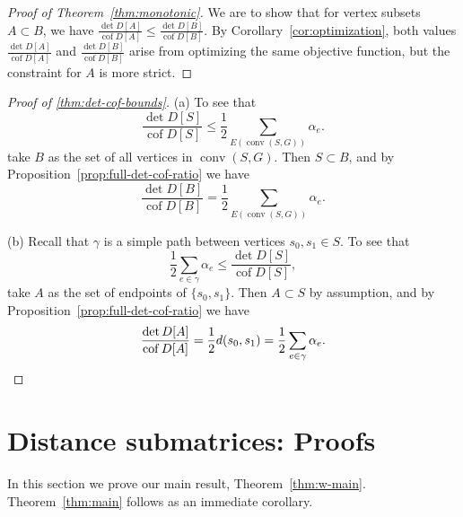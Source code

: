 \documentclass{amsart}
\theoremstyle{definition}
\DeclareMathOperator{\cof}{cof}
\DeclareMathOperator{\conv}{conv}
\newcommand{\display}{\displaystyle}
\begin{document}
\begin{proof}[Proof of Theorem~\ref{thm:monotonic}]
We are to show that for vertex subsets $A \subset B$, we have
$\displaystyle 
\frac{\det D[A]}{\cof D[A]} \leq \frac{\det D[B]}{\cof D[B]}.
$
By Corollary~\ref{cor:optimization}, both values $\display \frac{\det D[A]}{\cof D[A]}$ and $\display \frac{\det D[B]}{\cof D[B]}$ arise from optimizing the same objective function, 
but the constraint for $A$ is more strict.
\end{proof}

\begin{proof}[Proof of \ref{thm:det-cof-bounds}]
(a)
To see that
\begin{equation*}
 \frac{\det D[S]}{\cof D[S]} \leq \frac12 \sum_{E(\conv(S, G))} \alpha_e .
\end{equation*}
take $B$ as the set of all vertices in $\conv(S, G)$.
Then $S \subset B$, and by Proposition~\ref{prop:full-det-cof-ratio} we have
\[
 \frac{\det D[B]}{\cof D[B]} = \frac12 \sum_{E(\conv(S, G))} \alpha_e .
\]

(b) 
Recall that $\gamma$ is a simple path between vertices $s_0, s_1 \in S$.
To see that
\begin{equation*}
	\frac12 \sum_{e \in \gamma} \alpha_e \leq \frac{\det D[S]}{\cof D[S]},
\end{equation*}
take $A$ as the set of endpoints of $\{s_0, s_1\}$.
Then $A \subset S$ by assumption, and by Proposition~\ref{prop:full-det-cof-ratio} we have
\[
	\frac{\det D[A]}{\cof D[A]}
	= \frac12 d(s_0, s_1) 
	= \frac12 \sum_{e \in \gamma} \alpha_e .
	\qedhere
\]
\end{proof}


\section{Distance submatrices: Proofs}
In this section we prove our main result, Theorem~\ref{thm:w-main}.
Theorem~\ref{thm:main} follows as an immediate corollary.
\end{document}
